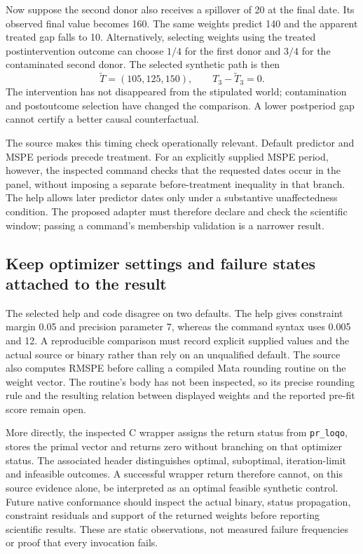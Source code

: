 Now suppose the second donor also receives a spillover of 20 at the final date.
Its observed final value becomes 160. The same weights predict 140 and the
apparent treated gap falls to 10. Alternatively, selecting weights using the
treated postintervention outcome can choose $1/4$ for the first donor and $3/4$
for the contaminated second donor. The selected synthetic path is then
\begin{equation}
 \widetilde T=(105,125,150),\qquad T_3-\widetilde T_3=0.
 \label{exec19:synth-leakage}
\end{equation}
The intervention has not disappeared from the stipulated world; contamination
and postoutcome selection have changed the comparison. A lower postperiod gap
cannot certify a better causal counterfactual.~\citep{exec19_synth_contract_reference}

The source makes this timing check operationally relevant. Default predictor
and MSPE periods precede treatment. For an explicitly supplied MSPE period,
however, the inspected command checks that the requested dates occur in the
panel, without imposing a separate before-treatment inequality in that branch.
The help allows later predictor dates only under a substantive unaffectedness
condition. The proposed adapter must therefore declare and check the scientific
window; passing a command's membership validation is a narrower result.
\citep{exec19_synth_stata_source}

\subsection{Keep optimizer settings and failure states attached to the result}
\label{exec19:synth-numerics}

The selected help and code disagree on two defaults. The help gives constraint
margin 0.05 and precision parameter 7, whereas the command syntax uses 0.005 and
12. A reproducible comparison must record explicit supplied values and the
actual source or binary rather than rely on an unqualified default. The source
also computes RMSPE before calling a compiled Mata rounding routine on the
weight vector. The routine's body has not been inspected, so its precise
rounding rule and the resulting relation between displayed weights and the
reported pre-fit score remain open.~\citep{exec19_synth_stata_source}

More directly, the inspected C wrapper assigns the return status from
\texttt{pr\_loqo}, stores the primal vector and returns zero without branching
on that optimizer status. The associated header distinguishes optimal,
suboptimal, iteration-limit and infeasible outcomes. A successful wrapper return
therefore cannot, on this source evidence alone, be interpreted as an optimal
feasible synthetic control. Future native conformance should inspect the actual
binary, status propagation, constraint residuals and support of the returned
weights before reporting scientific results. These are static observations,
not measured failure frequencies or proof that every invocation fails.
\citep{exec19_synth_stata_source}

